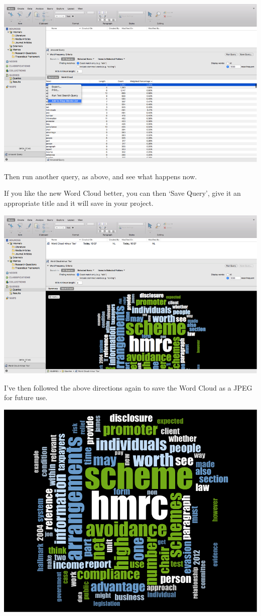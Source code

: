 \documentclass[]{book}
\theoremstyle{definition}
\theoremstyle{definition}
\theoremstyle{definition}
\theoremstyle{remark}
\begin{document}
\includegraphics{imgs/qual_28.png}

Then run another query, as above, and see what happens now.

If you like the new Word Cloud better, you can then `Save Query', give
it an appropriate title and it will save in your project.

\includegraphics{imgs/qual_29.png}

I've then followed the above directions again to save the Word Cloud as
a JPEG for future use.

\includegraphics{imgs/qual_30.png}
\end{document}
